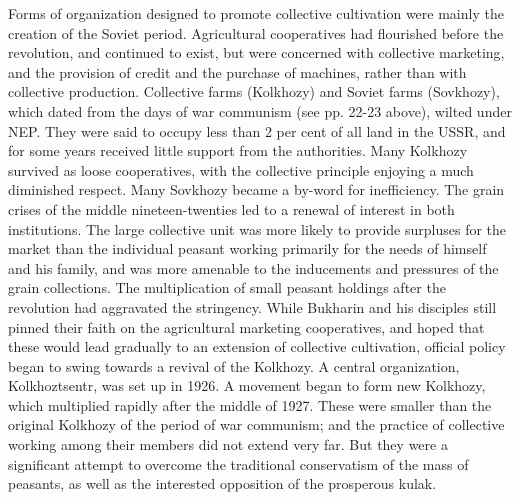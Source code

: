 Forms of organization designed to promote collective cultivation were mainly the creation of the Soviet period. Agricultural cooperatives had flourished before the revolution, and continued to exist, but were concerned with collective marketing, and the provision of credit and the purchase of machines, rather than with collective production. Collective farms (Kolkhozy) and Soviet farms (Sovkhozy), which dated from the days of war communism (see pp. 22-23 above), wilted under NEP. They were said to occupy less than 2 per cent of all land in the USSR, and for some years received little support from the authorities. Many Kolkhozy survived as loose cooperatives, with the collective principle enjoying a much diminished respect. Many Sovkhozy became a by-word for inefficiency. The grain crises of the middle nineteen-twenties led to a renewal of interest in both institutions. The large collective unit was more likely to provide surpluses for the market than the individual peasant working primarily for the needs of himself and his family, and was more amenable to the inducements and pressures of the grain collections. The multiplication of small peasant holdings after the revolution had aggravated the stringency. While Bukharin and his disciples still pinned their faith on the agricultural marketing cooperatives, and hoped that these would lead gradually to an extension of collective cultivation, official policy began to swing towards a revival of the Kolkhozy. A central organization, Kolkhoztsentr, was set up in 1926. A movement began to form new Kolkhozy, which multiplied rapidly after the middle of 1927. These were smaller than the original Kolkhozy of the period of war communism; and the practice of collective working among their members did not extend very far. But they were a significant attempt to overcome the traditional conservatism of the mass of peasants, as well as the interested opposition of the prosperous kulak. 

